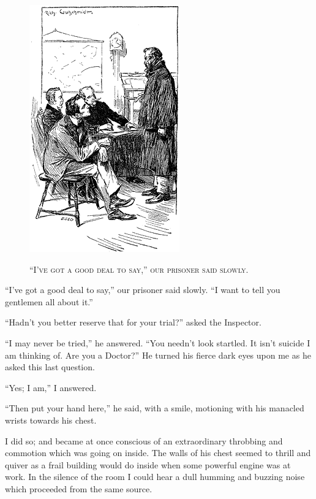 \documentclass[12pt,english]{book}
\newcommand{\noun}[1]{\textsc{#1}}
\begin{document}
%
\begin{figure}[htbp]
\noindent \begin{center}\includegraphics{images/study10-stud-22.png}\end{center}

\noindent \begin{center}\noun{{}``I've got a good deal to say,''
our prisoner said slowly.}\end{center}
\end{figure}
{}``I've got a good deal to say,'' our prisoner said slowly. {}``I
want to tell you gentlemen all about it.''

{}``Hadn't you better reserve that for your trial?'' asked the Inspector.

{}``I may never be tried,'' he answered. {}``You needn't look startled.
It isn't suicide I am thinking of. Are you a Doctor?'' He turned
his fierce dark eyes upon me as he asked this last question.

{}``Yes; I am,'' I answered.

{}``Then put your hand here,'' he said, with a smile, motioning
with his manacled wrists towards his chest.

I did so; and became at once conscious of an extraordinary throbbing
and commotion which was going on inside. The walls of his chest seemed
to thrill and quiver as a frail building would do inside when some
powerful engine was at work. In the silence of the room I could hear
a dull humming and buzzing noise which proceeded from the same source.
\end{document}

